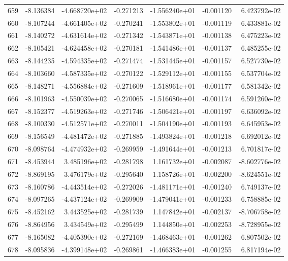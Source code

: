 \begin{tabular}{rrrrrrr}
 659 &  -8.136384 & -4.668720e+02 & -0.271213 & -1.556240e+01 &   -0.001120 &  6.423792e-02 \\
 660 &  -8.107244 & -4.661405e+02 & -0.270241 & -1.553802e+01 &   -0.001119 &  6.433881e-02 \\
 661 &  -8.140272 & -4.631614e+02 & -0.271342 & -1.543871e+01 &   -0.001138 &  6.475223e-02 \\
 662 &  -8.105421 & -4.624458e+02 & -0.270181 & -1.541486e+01 &   -0.001137 &  6.485255e-02 \\
 663 &  -8.144235 & -4.594335e+02 & -0.271474 & -1.531445e+01 &   -0.001157 &  6.527730e-02 \\
 664 &  -8.103660 & -4.587335e+02 & -0.270122 & -1.529112e+01 &   -0.001155 &  6.537704e-02 \\
 665 &  -8.148271 & -4.556884e+02 & -0.271609 & -1.518961e+01 &   -0.001177 &  6.581342e-02 \\
 666 &  -8.101963 & -4.550039e+02 & -0.270065 & -1.516680e+01 &   -0.001174 &  6.591260e-02 \\
 667 &  -8.152377 & -4.519263e+02 & -0.271746 & -1.506421e+01 &   -0.001197 &  6.636092e-02 \\
 668 &  -8.100330 & -4.512571e+02 & -0.270011 & -1.504190e+01 &   -0.001193 &  6.645953e-02 \\
 669 &  -8.156549 & -4.481472e+02 & -0.271885 & -1.493824e+01 &   -0.001218 &  6.692012e-02 \\
 670 &  -8.098764 & -4.474932e+02 & -0.269959 & -1.491644e+01 &   -0.001213 &  6.701817e-02 \\
 671 &  -8.453944 &  3.485196e+02 & -0.281798 &  1.161732e+01 &   -0.002087 & -8.602776e-02 \\
 672 &  -8.869195 &  3.476179e+02 & -0.295640 &  1.158726e+01 &   -0.002200 & -8.624551e-02 \\
 673 &  -8.160786 & -4.443514e+02 & -0.272026 & -1.481171e+01 &   -0.001240 &  6.749137e-02 \\
 674 &  -8.097265 & -4.437124e+02 & -0.269909 & -1.479041e+01 &   -0.001233 &  6.758885e-02 \\
 675 &  -8.452162 &  3.443525e+02 & -0.281739 &  1.147842e+01 &   -0.002137 & -8.706758e-02 \\
 676 &  -8.864956 &  3.434549e+02 & -0.295499 &  1.144850e+01 &   -0.002253 & -8.728955e-02 \\
 677 &  -8.165082 & -4.405390e+02 & -0.272169 & -1.468463e+01 &   -0.001262 &  6.807502e-02 \\
 678 &  -8.095836 & -4.399148e+02 & -0.269861 & -1.466383e+01 &   -0.001255 &  6.817194e-02 \\

\end{tabular}
